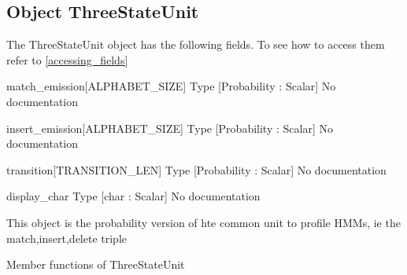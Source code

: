 \subsection{Object ThreeStateUnit}

\label{object_ThreeStateUnit}

The ThreeStateUnit object has the following fields. To see how to access them refer to \ref{accessing_fields}
\begin{description}
\item{match_emission[ALPHABET_SIZE]} Type [Probability : Scalar] No documentation

\item{insert_emission[ALPHABET_SIZE]} Type [Probability : Scalar] No documentation

\item{transition[TRANSITION_LEN]} Type [Probability : Scalar] No documentation

\item{display_char} Type [char : Scalar] No documentation

\end{description}
This object is the probability version
of hte common unit to profile HMMs, ie
the match,insert,delete triple




Member functions of ThreeStateUnit

